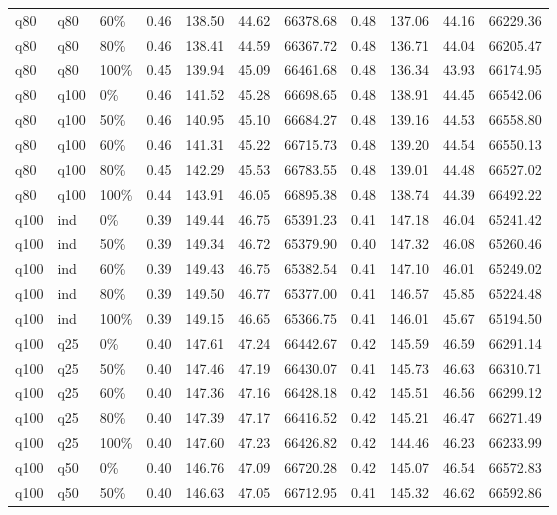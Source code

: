 \begin{longtable}{lllrrrrrrrr}
  q80 & q80 & 60\% & 0.46 & 138.50 & 44.62 & 66378.68 & 0.48 & 137.06 & 44.16 & 66229.36 \\ 
  q80 & q80 & 80\% & 0.46 & 138.41 & 44.59 & 66367.72 & 0.48 & 136.71 & 44.04 & 66205.47 \\ 
  q80 & q80 & 100\% & 0.45 & 139.94 & 45.09 & 66461.68 & 0.48 & 136.34 & 43.93 & 66174.95 \\ 
  q80 & q100 & 0\% & 0.46 & 141.52 & 45.28 & 66698.65 & 0.48 & 138.91 & 44.45 & 66542.06 \\ 
  q80 & q100 & 50\% & 0.46 & 140.95 & 45.10 & 66684.27 & 0.48 & 139.16 & 44.53 & 66558.80 \\ 
  q80 & q100 & 60\% & 0.46 & 141.31 & 45.22 & 66715.73 & 0.48 & 139.20 & 44.54 & 66550.13 \\ 
  q80 & q100 & 80\% & 0.45 & 142.29 & 45.53 & 66783.55 & 0.48 & 139.01 & 44.48 & 66527.02 \\ 
  q80 & q100 & 100\% & 0.44 & 143.91 & 46.05 & 66895.38 & 0.48 & 138.74 & 44.39 & 66492.22 \\ 
  q100 & ind & 0\% & 0.39 & 149.44 & 46.75 & 65391.23 & 0.41 & 147.18 & 46.04 & 65241.42 \\ 
  q100 & ind & 50\% & 0.39 & 149.34 & 46.72 & 65379.90 & 0.40 & 147.32 & 46.08 & 65260.46 \\ 
  q100 & ind & 60\% & 0.39 & 149.43 & 46.75 & 65382.54 & 0.41 & 147.10 & 46.01 & 65249.02 \\ 
  q100 & ind & 80\% & 0.39 & 149.50 & 46.77 & 65377.00 & 0.41 & 146.57 & 45.85 & 65224.48 \\ 
  q100 & ind & 100\% & 0.39 & 149.15 & 46.65 & 65366.75 & 0.41 & 146.01 & 45.67 & 65194.50 \\ 
  q100 & q25 & 0\% & 0.40 & 147.61 & 47.24 & 66442.67 & 0.42 & 145.59 & 46.59 & 66291.14 \\ 
  q100 & q25 & 50\% & 0.40 & 147.46 & 47.19 & 66430.07 & 0.41 & 145.73 & 46.63 & 66310.71 \\ 
  q100 & q25 & 60\% & 0.40 & 147.36 & 47.16 & 66428.18 & 0.42 & 145.51 & 46.56 & 66299.12 \\ 
  q100 & q25 & 80\% & 0.40 & 147.39 & 47.17 & 66416.52 & 0.42 & 145.21 & 46.47 & 66271.49 \\ 
  q100 & q25 & 100\% & 0.40 & 147.60 & 47.23 & 66426.82 & 0.42 & 144.46 & 46.23 & 66233.99 \\ 
  q100 & q50 & 0\% & 0.40 & 146.76 & 47.09 & 66720.28 & 0.42 & 145.07 & 46.54 & 66572.83 \\ 
  q100 & q50 & 50\% & 0.40 & 146.63 & 47.05 & 66712.95 & 0.41 & 145.32 & 46.62 & 66592.86 \\ 

\end{longtable}

